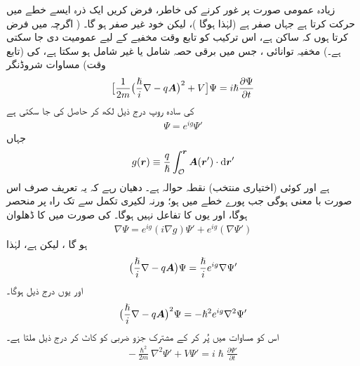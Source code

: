  زیادہ عمومی صورت پر غور کرنے کی خاطر، فرض کریں ایک ذرہ ایسے خطے میں حرکت کرتا ہے جہاں  صفر ہے (لہٰذا  ہوگا )، لیکن  خود غیر صفر ہو گا۔ ( اگرچہ میں فرض کرتا ہوں کہ  ساکن ہے، اس ترکیب کو تابع وقت مخفیے کے لیے عمومیت دی جا سکتی ہے۔) مخفیہ توانائی ، جس میں برقی حصہ  شامل یا غیر شامل ہو سکتا ہے، کی (تابع وقت) مساوات شروڈنگر 
\begin{align}\label{مساوات_حر_تابع_وقت_مساوات_شروڈنگر_اہارونو}
\big [ \frac{1}{2m} \big ( \frac{\hslash}{i} \nabla - q {{\boldsymbol{A}}} \big )^2 + V \big ] \Psi = i \hslash \frac{\partial \Psi}{\partial t}
\end{align}
کی سادہ روپ درج ذیل لکھ کر حاصل کی جا سکتی ہے 
\begin{align}
\Psi = e^{i g} \Psi'
\end{align}
جہاں 
\begin{align}
g (\kvec{r}) \equiv \frac{q}{\hslash} \int_{\mathcal{O}}^{\kvec{r}} \kvec{A} (\kvec{r}') \cdot \dif \kvec{r}'
\end{align}
ہے اور  کوئی (اختیاری منتخب) نقطہ حوالہ ہے۔ دھیان رہے کہ یہ تعریف صرف اس صورت با معنی ہوگی جب پورے خطے میں  ہو؛ ورنہ لکیری تکمل  سے  تک راہ پر منحصر ہوگا، اور یوں  کا تفاعل نہیں ہوگا۔  کی صورت میں  کا ڈھلوان 
\begin{align*}
\nabla \Psi = e^{i g} (i \nabla g) \Psi' + e^{ig}(\nabla \Psi')
\end{align*}
ہو گا ، لیکن  ہے، لہٰذا 
\begin{align}\label{مساوات_حر_ہیملٹنی_اہارونو_حاصل_الف}
\big ( \frac{\hslash}{i} \nabla - q {{\boldsymbol{A}}} \big ) \Psi = \frac{\hslash}{i} e^{i g} \nabla \Psi'
\end{align}
اور یوں درج ذیل ہوگا۔
\begin{align}\label{مساوات_حر_ہیملٹنی_اہارونو_حاصل_ب}
\big ( \frac{\hslash}{i} \nabla - q {{\boldsymbol{A}}} \big )^2 \Psi = - \hslash^2 e^{i g} \nabla^2 \Psi'
\end{align}
اس کو مساوات  میں پُر کر کے مشترک جزو ضربی  کو کاٹ کر درج ذیل ملتا ہے۔
\begin{align}\label{مساوات_حر_مساوات_شروڈنگر_بغیر_اے}
- \frac{\hslash^2}{2m} \nabla^2 \Psi' + V \Psi' = i \hslash \frac{\partial \Psi'}{\partial t}
\end{align}
%
